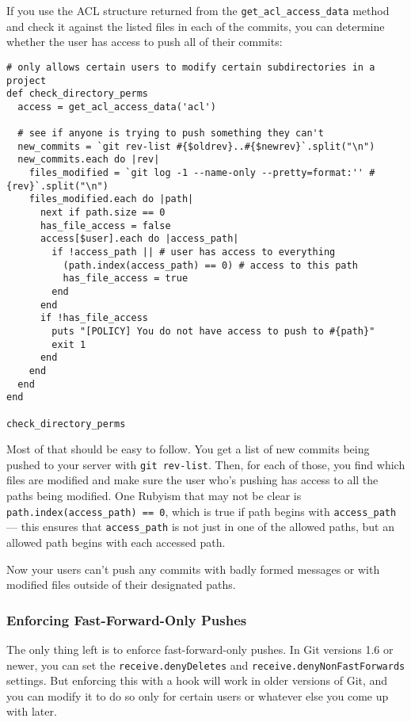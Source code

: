 \documentclass[a4paper]{book}
\begin{document}
If you use the ACL structure returned from the \texttt{get\_acl\_access\_data} method and check it against the listed files in each of the commits, you can determine whether the user has access to push all of their commits:

\begin{shaded}\begin{verbatim}
# only allows certain users to modify certain subdirectories in a project
def check_directory_perms
  access = get_acl_access_data('acl')

  # see if anyone is trying to push something they can't
  new_commits = `git rev-list #{$oldrev}..#{$newrev}`.split("\n")
  new_commits.each do |rev|
    files_modified = `git log -1 --name-only --pretty=format:'' #{rev}`.split("\n")
    files_modified.each do |path|
      next if path.size == 0
      has_file_access = false
      access[$user].each do |access_path|
        if !access_path || # user has access to everything
          (path.index(access_path) == 0) # access to this path
          has_file_access = true
        end
      end
      if !has_file_access
        puts "[POLICY] You do not have access to push to #{path}"
        exit 1
      end
    end
  end
end

check_directory_perms
\end{verbatim}\end{shaded}

Most of that should be easy to follow. You get a list of new commits being pushed to your server with \texttt{git rev-list}. Then, for each of those, you find which files are modified and make sure the user who's pushing has access to all the paths being modified. One Rubyism that may not be clear is \texttt{path.index(access\_path) == 0}, which is true if path begins with \texttt{access\_path} --- this ensures that \texttt{access\_path} is not just in one of the allowed paths, but an allowed path begins with each accessed path.

Now your users can't push any commits with badly formed messages or with modified files outside of their designated paths.

\subsubsection{Enforcing Fast-Forward-Only Pushes}

The only thing left is to enforce fast-forward-only pushes. In Git versions 1.6 or newer, you can set the \texttt{receive.denyDeletes} and \texttt{receive.denyNonFastForwards} settings. But enforcing this with a hook will work in older versions of Git, and you can modify it to do so only for certain users or whatever else you come up with later.
\end{document}
